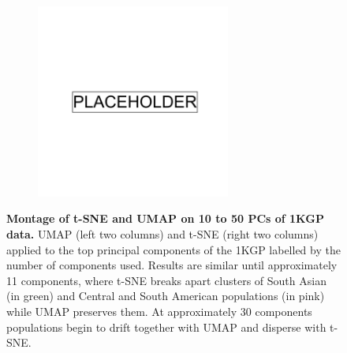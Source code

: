 \begin{figure}[ht]
    \centering
    \begin{subfigure}{0.95\textwidth}
    \includegraphics[width=0.7\textwidth]{placeholder.png}
    \end{subfigure}
    \caption[Montage of t-SNE and UMAP on 10 to 50 PCs of 1KGP data]{\textbf{Montage of t-SNE and UMAP on 10 to 50 PCs of 1KGP data.} UMAP (left two columns) and t-SNE (right two columns) applied to the top principal components of the 1KGP labelled by the number of components used. Results are similar until approximately 11 components, where t-SNE breaks apart clusters of South Asian (in green) and Central and South American populations (in pink) while UMAP preserves them. At approximately 30 components populations begin to drift together with UMAP and disperse with t-SNE.}
    \label{fig:supp_megamontage_pc10_50}
\end{figure}

\newpage

